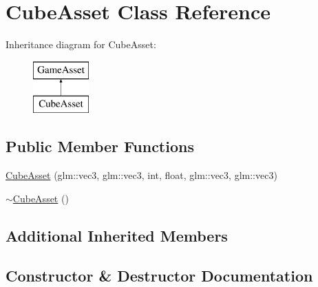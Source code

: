 \hypertarget{classCubeAsset}{}\section{Cube\+Asset Class Reference}
\label{classCubeAsset}
Inheritance diagram for Cube\+Asset\+:\begin{figure}[H]
\begin{center}
\leavevmode
\includegraphics[height=2.000000cm]{classCubeAsset}
\end{center}
\end{figure}
\subsection*{Public Member Functions}
\begin{DoxyCompactItemize}
\item 
\hyperlink{classCubeAsset_ac4b0d9e729f165e66c79d8c37f1109a2}{Cube\+Asset} (glm\+::vec3, glm\+::vec3, int, float, glm\+::vec3, glm\+::vec3)
\item 
\hyperlink{classCubeAsset_ab3ab9a5da82cbf8537a28652410093b1}{$\sim$\+Cube\+Asset} ()
\end{DoxyCompactItemize}
\subsection*{Additional Inherited Members}


\subsection{Constructor \& Destructor Documentation}
\hypertarget{classCubeAsset_ac4b0d9e729f165e66c79d8c37f1109a2}{}
